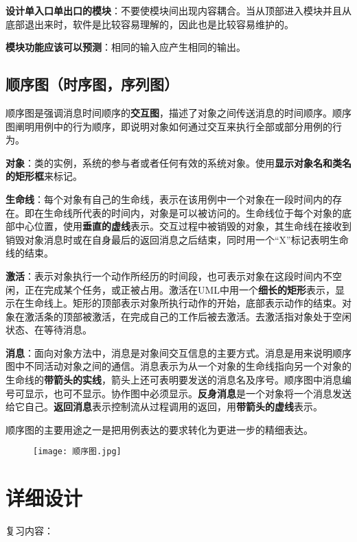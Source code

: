 \documentclass[cn, blue, normal, 12pt]{elegantnote}
\begin{document}
\textbf{设计单入口单出口的模块}：不要使模块间出现内容耦合。当从顶部进入模块并且从底部退出来时，软件是比较容易理解的，因此也是比较容易维护的。

\textbf{模块功能应该可以预测}：相同的输入应产生相同的输出。

\subsection{顺序图（时序图，序列图）}

顺序图是强调消息时间顺序的\textbf{交互图}，描述了对象之间传送消息的时间顺序。顺序图阐明用例中的行为顺序，即说明对象如何通过交互来执行全部或部分用例的行为。

\textbf{对象}：类的实例，系统的参与者或者任何有效的系统对象。使用\textbf{显示对象名和类名的矩形框}来标记。

\textbf{生命线}：每个对象有自己的生命线，表示在该用例中一个对象在一段时间内的存在。即在生命线所代表的时间内，对象是可以被访问的。生命线位于每个对象的底部中心位置，使用\textbf{垂直的虚线}表示。交互过程中被销毁的对象，其生命线在接收到销毁对象消息时或在自身最后的返回消息之后结束，同时用一个“X”标记表明生命线的结束。

\textbf{激活}：表示对象执行一个动作所经历的时间段，也可表示对象在这段时间内不空闲，正在完成某个任务，或正被占用。激活在UML中用一个\textbf{细长的矩形}表示，显示在生命线上。矩形的顶部表示对象所执行动作的开始，底部表示动作的结束。对象在激活条的顶部被激活，在完成自己的工作后被去激活。去激活指对象处于空闲状态、在等待消息。

\textbf{消息}：面向对象方法中，消息是对象间交互信息的主要方式。消息是用来说明顺序图中不同活动对象之间的通信。消息表示为从一个对象的生命线指向另一个对象的生命线的\textbf{带箭头的实线}，箭头上还可表明要发送的消息名及序号。顺序图中消息编号可显示，也可不显示。协作图中必须显示。\textbf{反身消息}是一个对象将一个消息发送给它自己。\textbf{返回消息}表示控制流从过程调用的返回，用\textbf{带箭头的虚线}表示。

顺序图的主要用途之一是把用例表达的要求转化为更进一步的精细表达。

\begin{figure}[htbp]
    \centering
    \texttt{[image: 顺序图.jpg]}
\end{figure}

\section{详细设计}

复习内容：
\end{document}
